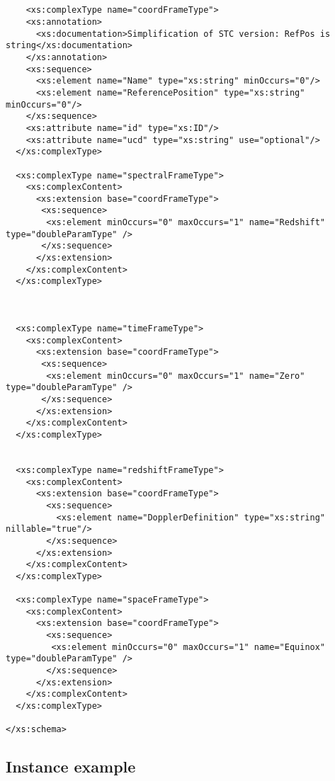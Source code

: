 {\begin{flushleft}
\begin{fmppage}
\begin{verbatim}
\end{verbatim}
\end{fmppage}

\begin{fmppage}
\begin{verbatim}


    <xs:complexType name="coordFrameType">
    <xs:annotation>
      <xs:documentation>Simplification of STC version: RefPos is string</xs:documentation>
    </xs:annotation>
    <xs:sequence>
      <xs:element name="Name" type="xs:string" minOccurs="0"/>
      <xs:element name="ReferencePosition" type="xs:string" minOccurs="0"/>
    </xs:sequence>
    <xs:attribute name="id" type="xs:ID"/>
    <xs:attribute name="ucd" type="xs:string" use="optional"/>
  </xs:complexType>

  <xs:complexType name="spectralFrameType">
    <xs:complexContent>
      <xs:extension base="coordFrameType">
       <xs:sequence>
        <xs:element minOccurs="0" maxOccurs="1" name="Redshift" type="doubleParamType" />
       </xs:sequence>
      </xs:extension>
    </xs:complexContent>
  </xs:complexType>



  <xs:complexType name="timeFrameType">
    <xs:complexContent>
      <xs:extension base="coordFrameType">
       <xs:sequence>
        <xs:element minOccurs="0" maxOccurs="1" name="Zero" type="doubleParamType" />
       </xs:sequence>
      </xs:extension>
    </xs:complexContent>
  </xs:complexType>


  <xs:complexType name="redshiftFrameType">
    <xs:complexContent>
      <xs:extension base="coordFrameType">
        <xs:sequence>
          <xs:element name="DopplerDefinition" type="xs:string" nillable="true"/>
        </xs:sequence>
      </xs:extension>
    </xs:complexContent>
  </xs:complexType>

  <xs:complexType name="spaceFrameType">
    <xs:complexContent>
      <xs:extension base="coordFrameType">
        <xs:sequence>
         <xs:element minOccurs="0" maxOccurs="1" name="Equinox" type="doubleParamType" />
        </xs:sequence>
      </xs:extension>
    </xs:complexContent>
  </xs:complexType>

</xs:schema>

\end{verbatim}
\end{fmppage}
\end{flushleft}
}



\subsection{Instance example}





